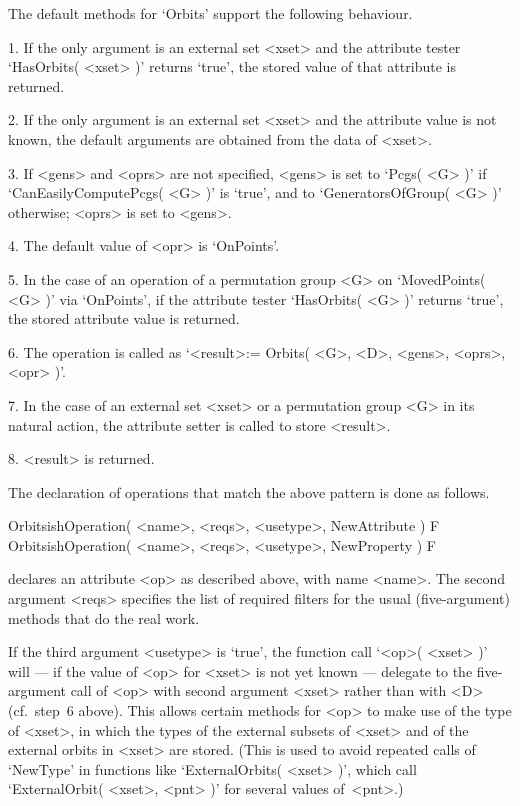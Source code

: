 The default methods for `Orbits' support the following behaviour.
\beginlist
  \item{1.}
    If the only argument is an external set <xset> and the attribute
    tester `HasOrbits( <xset> )' returns `true',
    the stored value of that attribute is returned.
  \item{2.}
    If the only argument is an external set <xset> and the attribute
    value is not known,
    the default arguments are obtained from the data of <xset>.
  \item{3.}
    If <gens> and <oprs> are not specified,
    <gens> is set to `Pcgs( <G> )' if `CanEasilyComputePcgs( <G> )'
    is `true', and to `GeneratorsOfGroup( <G> )' otherwise;
    <oprs> is set to <gens>.
  \item{4.}
    The default value of <opr> is `OnPoints'.
  \item{5.}
    In the case of an operation of a permutation group <G>
    on `MovedPoints( <G> )' via `OnPoints',
    if the attribute tester `HasOrbits( <G> )' returns `true',
    the stored attribute value is returned.
  \item{6.}
    The operation is called as `<result>:= Orbits( <G>, <D>, <gens>,
    <oprs>, <opr> )'.
  \item{7.}
    In the case of an external set <xset> or a permutation group <G> in its
    natural action, the attribute setter is called to store <result>.
  \item{8.}
    <result> is returned.
\endlist

The declaration of operations that match the above pattern is done
as follows.

\>OrbitsishOperation( <name>, <reqs>, <usetype>, NewAttribute ) F
\>OrbitsishOperation( <name>, <reqs>, <usetype>, NewProperty ) F

declares an attribute <op> as described above, with name <name>.
The second argument <reqs> specifies the list of required filters
for the usual (five-argument) methods that do the real work.

If the third argument <usetype> is `true',
the function call `<op>( <xset> )' will
--- if the value of <op> for <xset> is not yet known ---
delegate to the five-argument call of <op> with second argument <xset>
rather than with <D> (cf.~step~6 above).
This allows certain methods for <op> to make use of the type of <xset>,
in which the types of the external subsets of <xset>
and of the external orbits in <xset> are stored.
(This is used to avoid repeated calls of `NewType' in functions like
`ExternalOrbits( <xset> )',
which call `ExternalOrbit( <xset>, <pnt> )' for several values of~<pnt>.)

